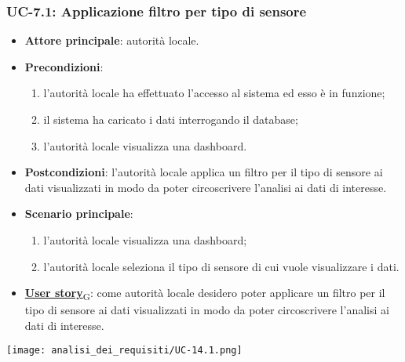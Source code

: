\subsubsection{UC-7.1: Applicazione filtro per tipo di sensore}
\begin{itemize}
	\item \textbf{Attore principale}: autorità locale.
	\item \textbf{Precondizioni}:
	      \begin{enumerate}
		      \item l'autorità locale ha effettuato l'accesso al sistema ed esso è in funzione;
		      \item il sistema ha caricato i dati interrogando il database;
		      \item l'autorità locale visualizza una dashboard.
	      \end{enumerate}
	\item \textbf{Postcondizioni}: l'autorità locale applica un filtro per il tipo di sensore ai dati visualizzati in modo da poter circoscrivere l'analisi ai dati di interesse.
	\item \textbf{Scenario principale}:
	      \begin{enumerate}
		      \item l'autorità locale visualizza una dashboard;
		      \item l'autorità locale seleziona il tipo di sensore di cui vuole visualizzare i dati.
	      \end{enumerate}
	\item \href{https://7last.github.io/docs/pb/documentazione-interna/glossario\#user-story}{\textbf{User story}\textsubscript{G}}:
	      come autorità locale desidero poter applicare un filtro per il tipo di sensore ai dati visualizzati in modo da poter circoscrivere l'analisi ai dati di interesse.
\end{itemize}
\begin{center}
	\texttt{[image: analisi\_dei\_requisiti/UC-14.1.png]}
\end{center}


